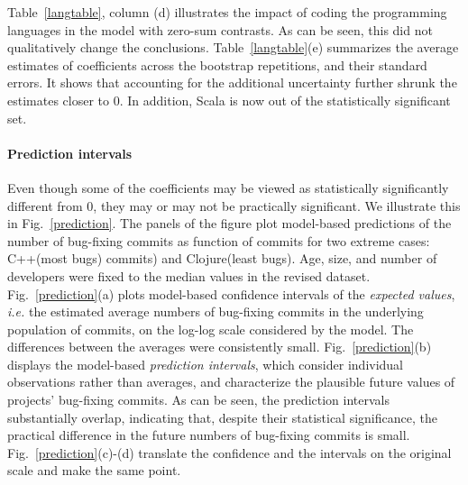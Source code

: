 \documentclass[acmsmall]{acmart}
\newcommand{\cpp}{{\sf  C++}\xspace}
\newcommand{\scala}{{\sf  Scala}\xspace}
\newcommand{\clojure}{{\sf  Clojure}\xspace}
\newcommand{\ie}{\emph{i.e.}\xspace}
\begin{document}
Table~\ref{langtable}, column (d) illustrates the impact of coding the
programming languages in the model with zero-sum contrasts. As can be seen,
this did not qualitatively change the conclusions.  Table~\ref{langtable}(e)
summarizes the average estimates of coefficients across the bootstrap
repetitions, and their standard errors. It shows that accounting for the
additional uncertainty further shrunk the estimates closer to 0. In
addition, \scala is now out of the statistically significant set.

\paragraph{Prediction intervals}
Even though some of the coefficients may be viewed as statistically
significantly different from 0, they may or may not be practically
significant. We illustrate this in Fig.~\ref{prediction}. The panels of the
figure plot model-based predictions of the number of bug-fixing commits as
function of commits for two extreme cases: \cpp (most bugs) commits) and
\clojure (least bugs).  Age, size, and number of developers were fixed to
the median values in the revised dataset. Fig.~\ref{prediction}(a) plots
model-based confidence intervals of the {\it expected values}, \ie the
estimated average numbers of bug-fixing commits in the underlying population
of commits, on the log-log scale considered by the model. The differences
between the averages were consistently small. Fig.~\ref{prediction}(b)
displays the model-based {\it prediction intervals}, which consider
individual observations rather than averages, and characterize the plausible
future values of projects' bug-fixing commits. As can be seen, the
prediction intervals substantially overlap, indicating that, despite their
statistical significance, the practical difference in the future numbers of
bug-fixing commits is small. Fig.~\ref{prediction}(c)-(d) translate the
confidence and the intervals on the original scale and make the same point.
\end{document}
